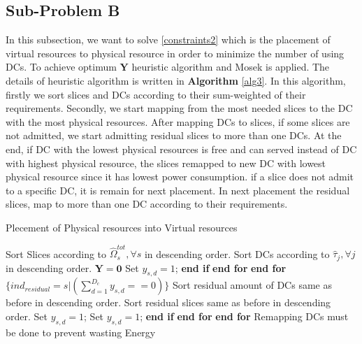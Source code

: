 \documentclass[conference]{IEEEtran}
\begin{document}
\subsection{Sub-Problem B}
In this subsection, we want to solve  \eqref{constraints2} which is the placement of virtual resources to physical resource in order to minimize the number of using DCs. 
To achieve optimum $\boldsymbol{Y}$ heuristic algorithm and Mosek is applied. The details of heuristic algorithm is written in \textbf{Algorithm} \eqref{alg3}. In this algorithm, firstly we sort slices and DCs according to their sum-weighted of their requirements. Secondly, we start mapping from the most needed slices to the DC with the most physical resources. After mapping DCs to slices, if some slices are not admitted, we start admitting residual slices to more than one DCs. At the end, if DC with the lowest physical resources is free and can served instead of DC with highest physical resource, the slices remapped to new DC with lowest physical resource since it has lowest power consumption.  
if a slice does not admit to a specific DC, it is remain for next placement. In next placement the residual slices, map to more than one DC according to their requirements.
\begin{algorithm}
\caption{Plecement of Physical resources into Virtual resources}\label{alg3}
\begin{algorithmic}[1]
\State Sort Slices according to $\hat{\Omega}_{s}^{tot} , \forall s$ in descending order.
\State Sort DCs according to $\hat{\tau}_j , \forall j$ in descending order. 
\State $\boldsymbol{Y} = \boldsymbol{0}$
\State Set $y_{s,d} = 1$;
\EndIf 
\State \textbf{end if}
\EndFor 
\State \textbf{end for}
\EndFor 
\State \textbf{end for}
\State  $\{ind_{residual} = s|({\sum_{d=1}^{D_c}y_{s,d}==0})\}$
\State Sort residual amount of DCs same as before in descending order.
\State Sort residual slices same as before in descending order.
\State Set $y_{s,d} = 1$;
\State Set $y_{s,d} = 1$;
\EndIf 
\State \textbf{end if}
\EndFor 
\State \textbf{end for}
\EndFor 
\State \textbf{end for}
\State Remapping DCs must be done to prevent wasting Energy
\end{algorithmic}
\end{algorithm}
\end{document}
